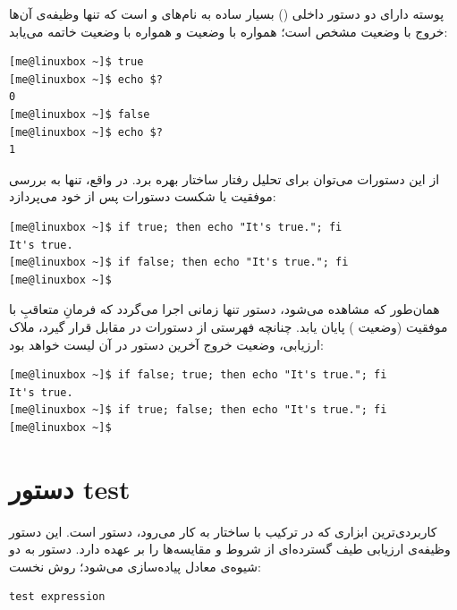 پوسته دارای دو دستور داخلی () بسیار ساده به نام‌های  و  است که تنها وظیفه‌ی آن‌ها خروج با وضعیت مشخص است؛  همواره با وضعیت  و  همواره با وضعیت  خاتمه می‌یابد:

\begin{latin}
\begin{lstlisting}
[me@linuxbox ~]$ true
[me@linuxbox ~]$ echo $?
0
[me@linuxbox ~]$ false
[me@linuxbox ~]$ echo $?
1
\end{lstlisting}
\end{latin}

از این دستورات می‌توان برای تحلیل رفتار ساختار  بهره برد. در واقع،  تنها به بررسی موفقیت یا شکست دستورات پس از خود می‌پردازد:

\begin{latin}
\begin{lstlisting}
[me@linuxbox ~]$ if true; then echo "It's true."; fi
It's true.
[me@linuxbox ~]$ if false; then echo "It's true."; fi
[me@linuxbox ~]$
\end{lstlisting}
\end{latin}

همان‌طور که مشاهده می‌شود، دستور  تنها زمانی اجرا می‌گردد که فرمانِ متعاقبِ  با موفقیت (وضعیت ) پایان یابد. چنانچه فهرستی از دستورات در مقابل  قرار گیرد، ملاک ارزیابی، وضعیت خروج آخرین دستور در آن لیست خواهد بود:

\begin{latin}
\begin{lstlisting}
[me@linuxbox ~]$ if false; true; then echo "It's true."; fi
It's true.
[me@linuxbox ~]$ if true; false; then echo "It's true."; fi
[me@linuxbox ~]$
\end{lstlisting}
\end{latin}

\section{دستور test}

کاربردی‌ترین ابزاری که در ترکیب با ساختار  به کار می‌رود، دستور  است. این دستور وظیفه‌ی ارزیابی طیف گسترده‌ای از شروط و مقایسه‌ها را بر عهده دارد. دستور  به دو شیوه‌ی معادل پیاده‌سازی می‌شود؛ روش نخست:

\begin{latin}
\begin{lstlisting}
test expression
\end{lstlisting}
\end{latin}

